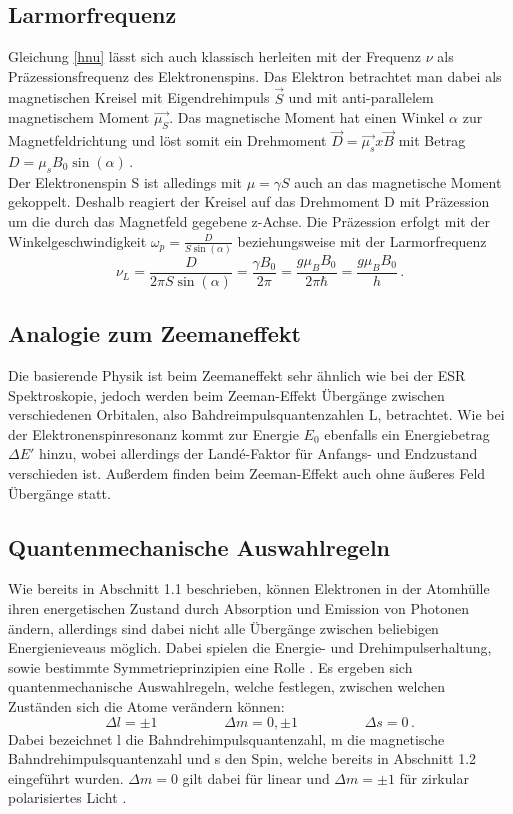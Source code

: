 \documentclass{scrartcl}
\begin{document}
\subsection{Larmorfrequenz}
Gleichung \ref{hnu} lässt sich auch klassisch herleiten mit der Frequenz $\nu$ als Präzessionsfrequenz des Elektronenspins. Das Elektron betrachtet man dabei als magnetischen Kreisel mit Eigendrehimpuls $\Vec{S}$ und mit anti-parallelem magnetischem Moment $\Vec{\mu_{S}}$. Das magnetische Moment hat einen Winkel $\alpha$ zur Magnetfeldrichtung und löst somit ein Drehmoment $\Vec{D}=\Vec{\mu_{s}}x\Vec{B}$ mit Betrag $D=\mu_{s}B_{0}\sin(\alpha)\,.$\\
Der Elektronenspin S ist alledings mit $\mu=\gamma S$ auch an das magnetische Moment gekoppelt. Deshalb reagiert der Kreisel auf das Drehmoment D mit Präzession um die durch das Magnetfeld gegebene z-Achse. 
Die Präzession erfolgt mit der Winkelgeschwindigkeit $\omega_{p}=\frac{D}{S \sin (\alpha)}$ beziehungsweise mit der Larmorfrequenz 
\begin{equation}
    \nu_{L}=\frac{D}{2\pi S \sin(\alpha)}=\frac{\gamma B_{0}}{2 \pi}=\frac{g\mu_{B}B_{0}}{2\pi \hbar}=\frac{g \mu_{B} B_{0}}{h}\,.
\end{equation}


\subsection{Analogie zum Zeemaneffekt}
Die basierende Physik ist beim Zeemaneffekt sehr ähnlich wie bei der ESR Spektroskopie, jedoch werden beim Zeeman-Effekt Übergänge zwischen verschiedenen Orbitalen, also Bahdreimpulsquantenzahlen L, betrachtet. Wie bei der Elektronenspinresonanz kommt zur Energie $E_{0}$ ebenfalls ein Energiebetrag $\Delta E'$ hinzu, wobei allerdings der Landé-Faktor für Anfangs- und Endzustand verschieden ist. Außerdem finden beim Zeeman-Effekt auch ohne äußeres Feld Übergänge statt.


\subsection{Quantenmechanische Auswahlregeln}
Wie bereits in Abschnitt 1.1 beschrieben, können Elektronen in der Atomhülle ihren energetischen Zustand durch Absorption und Emission von Photonen ändern, allerdings sind dabei nicht alle Übergänge zwischen beliebigen Energienieveaus möglich. Dabei spielen die Energie- und Drehimpulserhaltung, sowie bestimmte Symmetrieprinzipien eine Rolle \cite{Demtroder}. Es ergeben sich quantenmechanische Auswahlregeln, welche festlegen, zwischen welchen Zuständen sich die Atome verändern können:
\begin{equation}
    \Delta l = \pm 1 \hspace{2cm} \Delta m =0, \pm 1 \hspace{2cm} \Delta s = 0 \, . 
\end{equation}
Dabei bezeichnet l die Bahndrehimpulsquantenzahl, m die magnetische Bahndrehimpulsquantenzahl und s den Spin, welche bereits in Abschnitt 1.2 eingeführt wurden. $\Delta m = 0$ gilt dabei für linear und $\Delta m = \pm 1$ für zirkular polarisiertes Licht \cite{Demtroder}. \\ 
\end{document}
